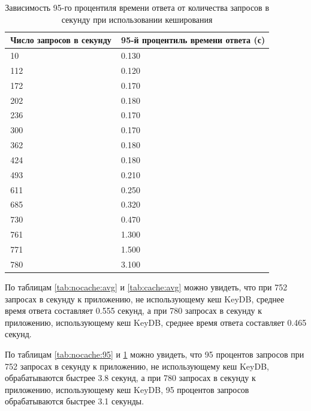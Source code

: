\begin{table}[H]
\centering
\caption{Зависимость 95-го процентиля времени ответа от количества запросов в секунду при использовании кеширования}
\begin{tabular}{|m{6.85cm}|m{9.25cm}|}
\hline
    \,\hfill \textbf{Число запросов в секунду} & \,\hfill \textbf{95-й процентиль времени ответа (с)} \\ \hline
    \,\hfill  10 \hfill\, & \,\hfill 0.130 \hfill\, \\ \hline
    \,\hfill 112 \hfill\, & \,\hfill 0.120 \hfill\, \\ \hline
    \,\hfill 172 \hfill\, & \,\hfill 0.170 \hfill\, \\ \hline
    \,\hfill 202 \hfill\, & \,\hfill 0.180 \hfill\, \\ \hline
    \,\hfill 236 \hfill\, & \,\hfill 0.170 \hfill\, \\ \hline
    \,\hfill 300 \hfill\, & \,\hfill 0.170 \hfill\, \\ \hline
    \,\hfill 362 \hfill\, & \,\hfill 0.180 \hfill\, \\ \hline
    \,\hfill 424 \hfill\, & \,\hfill 0.180 \hfill\, \\ \hline
    \,\hfill 493 \hfill\, & \,\hfill 0.210 \hfill\, \\ \hline
    \,\hfill 611 \hfill\, & \,\hfill 0.250 \hfill\, \\ \hline
    \,\hfill 685 \hfill\, & \,\hfill 0.320 \hfill\, \\ \hline
    \,\hfill 730 \hfill\, & \,\hfill 0.470 \hfill\, \\ \hline
    \,\hfill 761 \hfill\, & \,\hfill 1.300 \hfill\, \\ \hline
    \,\hfill 771 \hfill\, & \,\hfill 1.500 \hfill\, \\ \hline
    \,\hfill 780 \hfill\, & \,\hfill 3.100 \hfill\, \\ \hline
\end{tabular}
\label{tab:cache:95}
\end{table}

По таблицам \ref{tab:nocache:avg} и \ref{tab:cache:avg} можно увидеть, что при 752 запросах в секунду к приложению, не использующему кеш KeyDB, среднее время ответа составляет 0.555 секунд, а при 780 запросах в секунду к приложению, использующему кеш KeyDB, среднее время ответа составляет 0.465 секунд.

По таблицам \ref{tab:nocache:95} и \ref{tab:cache:95} можно увидеть, что 95 процентов запросов при 752 запросах в секунду к приложению, не использующему кеш KeyDB, обрабатываются быстрее 3.8 секунд, а при 780 запросах в секунду к приложению, использующему кеш KeyDB, 95 процентов запросов обрабатываются быстрее 3.1 секунды.

